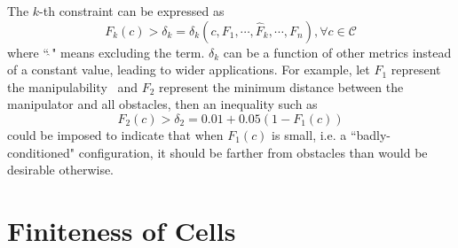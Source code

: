 \documentclass[conference]{IEEEtran}
\begin{document}
\begin{enumerate}
The $k$-th constraint can be expressed as
\begin{equation}\label{equ_strict}
F_k(c) > \delta_k = \delta_k(c, F_1, \cdots, \hat{F}_k, \cdots, F_{n}), \forall c\in \mathscr{C}
\end{equation} 
where ``$\hat{\ }$" means excluding the term. $\delta_k$ can be a function of other metrics instead of a constant value, leading to wider applications. 
For example, let $F_1$ represent the manipulability~\cite{yoshikawa1990translational} 
and $F_2$ represent the minimum distance between the manipulator and all obstacles, then an inequality such as
$$
F_2(c) > \delta_2 = 0.01+0.05(1-F_1(c))
$$
could be imposed to indicate that when $F_1(c)$ is small, i.e. a ``badly-conditioned" configuration, it should be farther from obstacles than would be desirable otherwise. 

\end{enumerate}
\section{Finiteness of Cells}\label{section_finiteness_of_cells}

\end{document}
